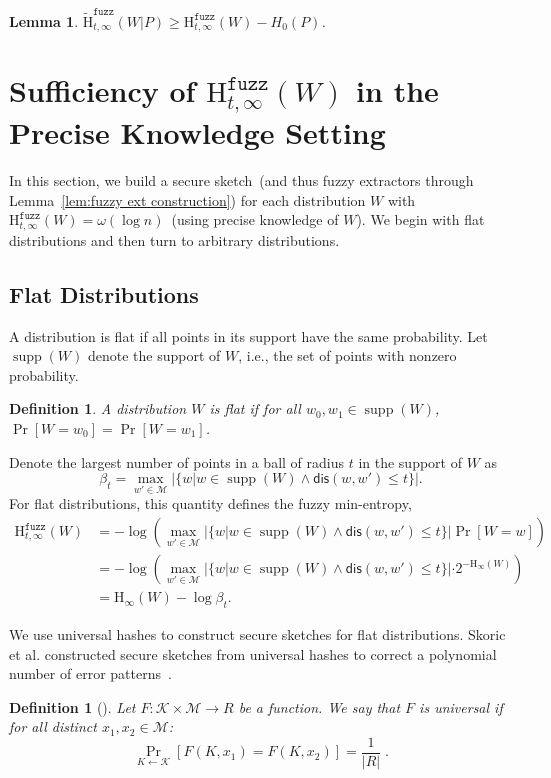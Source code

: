 \documentclass[11pt]{article}
\newtheorem{lemma}[theorem]{Lemma}
\newtheorem{definition}[theorem]{Definition}
\newcommand{\supp}{\operatorname{supp}}
\newcommand{\lemref}[1]{\mbox{Lemma~\ref{#1}}}
\newcommand{\dis}{\ensuremath{\mathsf{dis}}}
\newcommand{\Hoo}{\mathrm{H}_\infty}
\newcommand{\Hfuzz}{\mathrm{H}^{\mathtt{fuzz}}_{t,\infty}}
\newcommand{\Hfav}{\tilde{\mathrm{H}}^{\mathtt{fuzz}}_{t,\infty}}
\newcommand{\M}{\mathcal{M}}
\begin{document}
\noindent

\begin{lemma}
\label{lem:chain rule fuzz}
$\Hfav(W|P) \ge \Hfuzz(W) - H_0(P)$.
\end{lemma}


\section{Sufficiency of $\Hfuzz(W)$ in the Precise Knowledge Setting}
\label{sec:known distributions}
In this section, we build a secure sketch~(and thus fuzzy extractors through \lemref{lem:fuzzy ext construction}) for each distribution $W$ with $\Hfuzz(W) = \omega(\log n)$~(using precise knowledge of $W$).
We begin with flat distributions and then turn to arbitrary distributions.

\subsection{Flat Distributions}
A distribution is flat if all points in its support have the same probability. Let $\supp(W)$ denote the support of $W$, i.e., the set of points with nonzero probability.
\begin{definition}
A distribution $W$ is \emph{flat} if for all $w_0, w_1 \in \supp(W)$,  $\Pr[W=w_0] = \Pr[W=w_1]$.  
\end{definition}

\noindent
Denote the largest number of points in a ball of radius $t$ in the support of $W$ as \[\beta_{t} = \max_{w'\in\M} |\{w | w\in \supp(W) \wedge \dis(w ,w')\le t\}|.\]   For flat distributions, this quantity defines the fuzzy min-entropy,
\begin{align}
\Hfuzz(W) &= -\log \left(\max_{w' \in \mathcal{M}} \left| \{w | w\in \supp(W) \wedge \dis(w, w')\le t\} \right| \Pr[W=w]\right) \nonumber \\
&= -\log\left( \max_{w' \in \mathcal{M}} |\{w | w\in \supp(W) \wedge \dis(w, w')\le t\}| \cdot 2^{-\Hoo(W)}\right) \nonumber \\
&= \Hoo(W) -\log \beta_{t}.\label{eq:fuzz for flat}
\end{align}

\noindent We use universal hashes to construct secure sketches for flat distributions.  Skoric et al. constructed secure sketches from universal hashes to correct a polynomial number of error patterns~\cite{skoric2009efficient}.


\begin{definition}[\cite{DBLP:journals/jcss/CarterW79}]
Let $F : \mathcal{K} \times \mathcal{M} \to R$ be a function.  We say that $F$ is \emph{universal} if for all distinct $x_1, x_2 \in \mathcal{M}$:
\[
 \Pr_{K \leftarrow \mathcal{K}}[F(K, x_1) = F(K, x_2)] = \frac{1}{|R|} \;.
\]
\end{definition}
\end{document}
